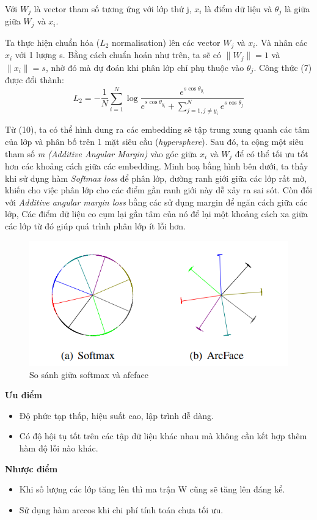 Với $W_j$ là vector tham số tương ứng với lớp thứ j, $x_i$ là điểm dữ liệu và $\theta_j$ là giữa giữa $W_j$ và $x_i$.  

Ta thực hiện chuẩn hóa ($L_2$ normalisation) lên các vector $W_j$ và $x_i$. Và nhân các $x_i$ với 1 lượng s. Bằng cách chuẩn hoán như trên, ta sẽ có $\|W_j\|=1$ và $\|x_i\|=s$, nhờ đó mà dự đoán khi phân lớp chỉ phụ thuộc vào $\theta_j$. Công thức (7) được đổi thành:  
\begin{equation}
L_2=-\frac{1}{N}\sum_{i=1}^{N}{\log{\frac{e^{s\cos{\theta_{y_i}}}}{e^{s\cos{\theta_{y_i}}} + \sum_{j=1,j\neq y_i}^{N}{e^{s\cos{\theta_{j}}}}}}}
\end{equation}

Từ (10), ta có thể hình dung ra các embedding sẽ tập trung xung quanh các tâm của lớp và phân bố trên 1 mặt siêu cầu (\textit{hypersphere}). Sau đó, ta cộng một siêu tham số \textit{m (Additive Angular Margin)} vào góc giữa $x_i$ và $W_j$ để có thể tối ưu tốt hơn các khoảng cách giữa các embedding. Minh hoạ bằng hình bên dưới, ta thấy khi sử dụng hàm \textit{Softmax loss} để phân lớp, đường ranh giới giữa các lớp rất mờ, khiến cho việc phân lớp cho các điểm gần ranh giới này dễ xảy ra sai sót. Còn đối với \textit{Additive angular margin loss} bằng các sử dụng margin để ngăn cách giữa các lớp, Các điểm dữ liệu co cụm lại gần tâm của nó để  lại một khoảng cách xa giữa các lớp từ đó giúp quá trình phân lớp ít lỗi hơn.

\begin{figure}[H]
    \begin{center}
        \includegraphics[scale=0.5]{images/ex2/softmax-vs-arcface}
        \caption{So sánh giữa softmax và afcface}
    \end{center}
\end{figure}
\textbf{Ưu điểm}
\begin{itemize}
	\item Độ phức tạp thấp, hiệu suất cao, lập trình dễ dàng.
	\item Có độ hội tụ tốt trên các tập dữ liệu khác nhau mà không cần kết hợp thêm hàm độ lỗi nào khác.
\end{itemize}
\textbf{Nhược điểm}
\begin{itemize}
	\item Khi số lượng các lớp tăng lên thì ma trận W cũng sẽ tăng lên đáng kể.
	\item Sử dụng hàm arccos khi chi phí tính toán chưa tối ưu.
\end{itemize}

